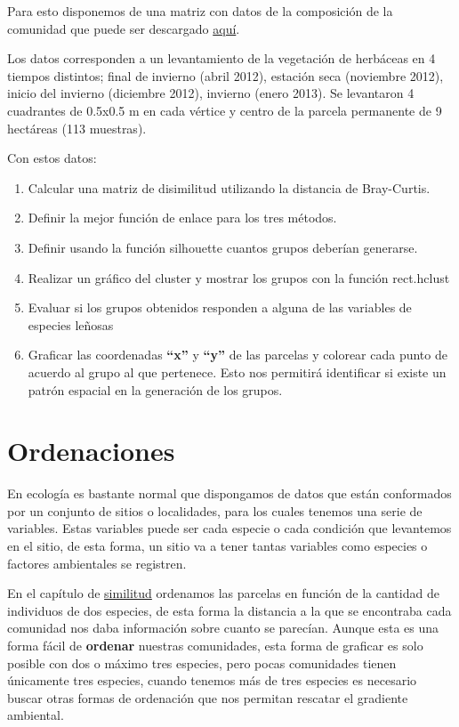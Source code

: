 \documentclass[]{book}
\begin{document}
Para esto disponemos de una matriz con datos de la composición de la
comunidad que puede ser descargado
\href{https://github.com/Ciespinosa/datos_practicas/blob/master/herbaceas.xlsx}{aquí}.

Los datos corresponden a un levantamiento de la vegetación de herbáceas
en 4 tiempos distintos; final de invierno (abril 2012), estación seca
(noviembre 2012), inicio del invierno (diciembre 2012), invierno (enero
2013). Se levantaron 4 cuadrantes de 0.5x0.5 m en cada vértice y centro
de la parcela permanente de 9 hectáreas (113 muestras).

Con estos datos:

\begin{enumerate}
\def\labelenumi{\arabic{enumi}.}
\item
  Calcular una matriz de disimilitud utilizando la distancia de
  Bray-Curtis.
\item
  Definir la mejor función de enlace para los tres métodos.
\item
  Definir usando la función silhouette cuantos grupos deberían
  generarse.
\item
  Realizar un gráfico del cluster y mostrar los grupos con la función
  rect.hclust
\item
  Evaluar si los grupos obtenidos responden a alguna de las variables de
  especies leñosas
\item
  Graficar las coordenadas \textbf{``x''} y \textbf{``y''} de las
  parcelas y colorear cada punto de acuerdo al grupo al que pertenece.
  Esto nos permitirá identificar si existe un patrón espacial en la
  generación de los grupos.
\end{enumerate}

\chapter{Ordenaciones}\label{ordenaciones}

En ecología es bastante normal que dispongamos de datos que están
conformados por un conjunto de sitios o localidades, para los cuales
tenemos una serie de variables. Estas variables puede ser cada especie o
cada condición que levantemos en el sitio, de esta forma, un sitio va a
tener tantas variables como especies o factores ambientales se
registren.

En el capítulo de
\href{https://ciespinosa.github.io/Similitud/index.html}{similitud}
ordenamos las parcelas en función de la cantidad de individuos de dos
especies, de esta forma la distancia a la que se encontraba cada
comunidad nos daba información sobre cuanto se parecían. Aunque esta es
una forma fácil de \textbf{ordenar} nuestras comunidades, esta forma de
graficar es solo posible con dos o máximo tres especies, pero pocas
comunidades tienen únicamente tres especies, cuando tenemos más de tres
especies es necesario buscar otras formas de ordenación que nos permitan
rescatar el gradiente ambiental.
\end{document}
